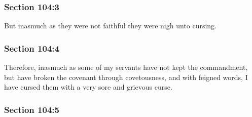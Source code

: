 
	\subsubsection{Section 104:3} %
		\label{DC104-3}

		But inasmuch as they were not faithful they were nigh unto cursing.


	\subsubsection{Section 104:4} %
		\label{DC104-4}

		Therefore, inasmuch as some of my servants have not kept the commandment, but have broken the covenant through covetousness, and with feigned words, I have cursed them with a very sore and grievous curse.


	\subsubsection{Section 104:5} %
		\label{DC104-5}

